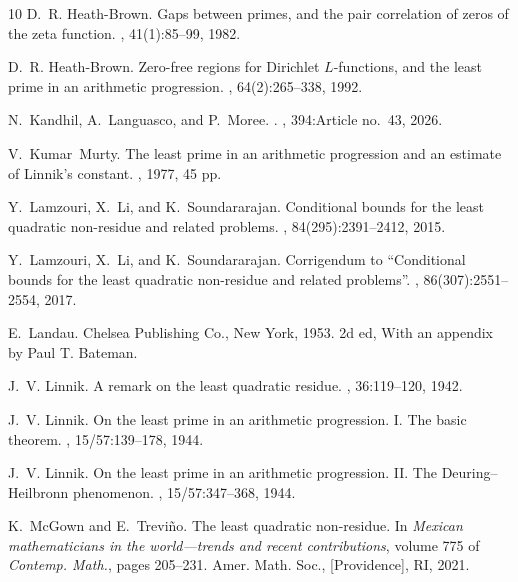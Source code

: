 \documentclass[pdflatex]{sn-jnl}%
\theoremstyle{sltheorems}
\theoremstyle{plainrem}
\theoremstyle{definition}
\begin{document}
\begin{thebibliography}{10}
D.~R. Heath-Brown.
\newblock Gaps between primes, and the pair correlation of zeros of the zeta
  function.
, 41(1):85--99, 1982.

D.~R. Heath-Brown.
\newblock Zero-free regions for {D}irichlet {$L$}-functions, and the least
  prime in an arithmetic progression.
, 64(2):265--338, 1992.

N.~Kandhil, A.~Languasco, and P.~Moree.
.
, 394:Article no.~43, 2026. 

V.~Kumar~Murty.
\newblock The least prime in an arithmetic progression and an estimate of
  {L}innik's constant.
, 1977, 45 pp.

Y.~Lamzouri, X.~Li, and K.~Soundararajan.
\newblock Conditional bounds for the least quadratic non-residue and related
  problems.
, 84(295):2391--2412, 2015.

Y.~Lamzouri, X.~Li, and K.~Soundararajan.
\newblock Corrigendum to ``{C}onditional bounds for the least quadratic
  non-residue and related problems''.
, 86(307):2551--2554, 2017.

E.~Landau.
\newblock Chelsea Publishing Co., New York, 1953.
\newblock 2d ed, With an appendix by Paul T. Bateman.

J.~V. Linnik.
\newblock A remark on the least quadratic residue.
, 36:119--120, 1942.

J.~V. Linnik.
\newblock On the least prime in an arithmetic progression. {I}. {T}he basic
  theorem.
, 15/57:139--178, 1944.

J.~V. Linnik.
\newblock On the least prime in an arithmetic progression. {II}. {T}he
  {D}euring--{H}eilbronn phenomenon.
, 15/57:347--368, 1944.

K.~McGown and E.~Trevi\~no.
\newblock The least quadratic non-residue.
\newblock In {\em Mexican mathematicians in the world---trends and recent
  contributions}, volume 775 of {\em Contemp. Math.}, pages 205--231. Amer.
  Math. Soc., [Providence], RI, 2021.


\end{thebibliography}
\end{document}
